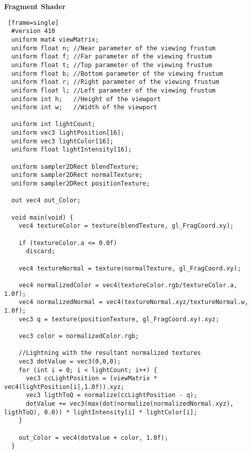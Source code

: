 \textbf{Fragment Shader}
\begin{lstlisting} [frame=single]
  #version 410
  uniform mat4 viewMatrix;
  uniform float n; //Near parameter of the viewing frustum
  uniform float f; //Far parameter of the viewing frustum
  uniform float t; //Top parameter of the viewing frustum
  uniform float b; //Bottom parameter of the viewing frustum
  uniform float r; //Right parameter of the viewing frustum
  uniform float l; //Left parameter of the viewing frustum
  uniform int h;   //Height of the viewport
  uniform int w;   //Width of the viewport

  uniform int lightCount;
  uniform vec3 lightPosition[16];
  uniform vec3 lightColor[16];
  uniform float lightIntensity[16];

  uniform sampler2DRect blendTexture;
  uniform sampler2DRect normalTexture;
  uniform sampler2DRect positionTexture;

  out vec4 out_Color;

  void main(void) {
    vec4 textureColor = texture(blendTexture, gl_FragCoord.xy);

    if (textureColor.a <= 0.0f)
      discard;

    vec4 textureNormal = texture(normalTexture, gl_FragCoord.xy);

    vec4 normalizedColor = vec4(textureColor.rgb/textureColor.a, 1.0f);
    vec4 normalizedNormal = vec4(textureNormal.xyz/textureNormal.w, 1.0f);
    vec3 q = texture(positionTexture, gl_FragCoord.xy).xyz;

    vec3 color = normalizedColor.rgb;

    //Lightning with the resultant normalized textures
    vec3 dotValue = vec3(0,0,0);
    for (int i = 0; i < lightCount; i++) {
      vec3 ccLightPosition = (viewMatrix * vec4(lightPosition[i],1.0f)).xyz;
      vec3 ligthToQ = normalize(ccLightPosition - q);
      dotValue += vec3(max(dot(normalize(normalizedNormal.xyz), ligthToQ), 0.0)) * lightIntensity[i] * lightColor[i];
    }

    out_Color = vec4(dotValue + color, 1.0f);
  }
\end{lstlisting}
